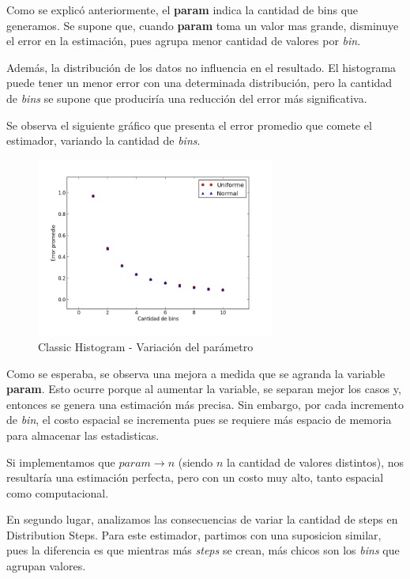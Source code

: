 \documentclass[10pt, a4paper,english,spanish,hidelinks]{article}
\begin{document}
Como se explicó anteriormente, el \textbf{param} indica la cantidad de bins que generamos. Se supone que, cuando \textbf{param} toma un valor mas grande, disminuye el error en la estimación,
pues agrupa menor cantidad de valores por \textit{bin}.

Además, la distribución de los datos no influencia en el resultado. El histograma puede tener un menor error con una determinada distribución, pero la cantidad de
\textit{bins} se supone que produciría una reducción del error más significativa.

Se observa el siguiente gráfico que presenta el error promedio que comete el estimador, variando
la cantidad de \textit{bins}.

\begin{figure}
  \centering
  \includegraphics[width=0.7\textwidth]{./imagenes/ejb2_classic_parameter_variation.png}
  \caption{Classic Histogram - Variación del parámetro}
\end{figure}

\newpage
Como se esperaba, se observa una mejora a medida que se agranda la variable \textbf{param}.
Esto ocurre porque al aumentar la variable, se separan mejor los casos y, entonces se genera una estimación más precisa.
Sin embargo, por cada incremento de \textit{bin}, el costo espacial se incrementa pues se requiere
más espacio de memoria para almacenar las estadisticas.

Si implementamos que $param \rightarrow n$ (siendo $n$ la cantidad de valores distintos), nos
resultaría una estimación perfecta, pero con un costo muy alto, tanto espacial como computacional.

En segundo lugar, analizamos las consecuencias de variar la cantidad de steps en Distribution Steps. Para este estimador, partimos con una suposicion similar, pues la diferencia es que mientras
más \textit{steps} se crean, más chicos son los \textit{bins} que agrupan valores.
\end{document}
